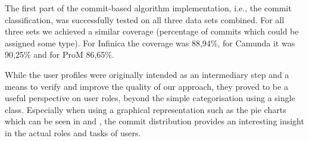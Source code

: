 The first part of the commit-based algorithm implementation, i.e., the commit classification, was successfully tested on all three data sets combined. For all three sets we achieved a similar coverage (percentage of commits which could be assigned some type). For Infinica the coverage was 88,94\%, for Camunda it was 90,25\% and for ProM 86,65\%.

While the user profiles were originally intended as an intermediary step and a means to verify and improve the quality of our approach, they proved to be a useful perspective on user roles, beyond the simple categorisation using a single class. Especially when using a graphical representation such as the pie charts which can be seen in  and , the commit distribution provides an interesting insight in the actual roles and tasks of users.

